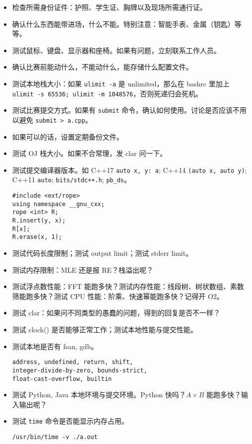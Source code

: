 
\begin{itemize}
    \setlength{\itemsep}{0pt}
    \setlength{\parskip}{1pt}
    \item 检查所需身份证件：护照、学生证、胸牌以及现场所需通行证。
    \item 确认什么东西能带进场，什么不能。特别注意：智能手表、金属（钥匙）等等。
    \item 测试鼠标、键盘、显示器和座椅。如果有问题，立刻联系工作人员。
    \item 确认比赛前能动什么，不能动什么，能存储什么配置文件。
    \item 测试本地栈大小：如果 \texttt{ulimit -a} 是 unlimited，那么在 bashrc 里加上 \texttt{ulimit -s 65536; ulimit -m 1048576}，否则死递归会死机。
    \item 测试比赛提交方式。如果有 \texttt{submit} 命令，确认如何使用。讨论是否应该不用以避免 \texttt{submit > a.cpp}。
    \item 如果可以的话，设置定期备份文件。
    \item 测试 OJ 栈大小。如果不合常理，发 clar 问一下。
    \item 测试提交编译器版本。如 C++17 \texttt{auto \lbrack x, y\rbrack : a}; C++14 \texttt{\lbrack \rbrack (auto x, auto y)}; C++11 \texttt{auto}; \texttt{bits/stdc++.h}; \texttt{pb\_ds}。
\begin{verbatim}
#include <ext/rope>
using namespace __gnu_cxx;
rope <int> R;
R.insert(y, x);
R[x];
R.erase(x, 1);
\end{verbatim}
    \item 测试代码长度限制；测试 output limit；测试 stderr limit。
    \item 测试内存限制：MLE 还是报 RE？栈溢出呢？
    \item 测试浮点数性能：FFT 能跑多快？测试内存性能：线段树、树状数组、素数筛能跑多快？测试 CPU 性能：阶乘、快速幂能跑多快？记得开 O2。
    \item 测试 clar：如果问不同类型的愚蠢的问题，得到的回复是否不一样？
    \item 测试 clock() 是否能够正常工作；测试本地性能与提交性能。
    \item 测试本地是否有 fsan, gdb。
        \begin{verbatim}
address, undefined, return, shift,
integer-divide-by-zero, bounds-strict,
float-cast-overflow, builtin
\end{verbatim}
    \item 测试 Python, Java 本地环境与提交环境。Python 快吗？$A\times B$ 能跑多快？输入输出呢？
    \item 测试 \texttt{time} 命令是否能显示内存占用。
\begin{verbatim}
/usr/bin/time -v ./a.out
\end{verbatim}
\end{itemize}
